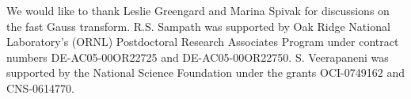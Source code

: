 We would like to thank Leslie Greengard and Marina Spivak for discussions on the fast Gauss transform. 
R.S. Sampath was supported by Oak Ridge National Laboratory's (ORNL) Postdoctoral Research Associates Program 
under contract numbers DE-AC05-00OR22725 and DE-AC05-00OR22750. S. Veerapaneni was supported by the National Science
 Foundation under the grants OCI-0749162 and CNS-0614770.

